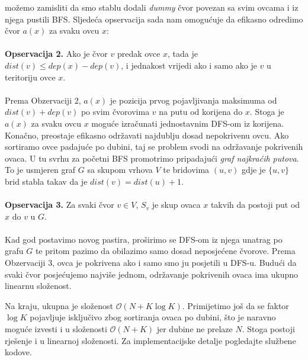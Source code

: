 možemo zamisliti da smo stablu dodali \textit{dummy} čvor povezan sa svim ovcama
i iz njega pustili BFS. Sljedeća opservacija sada nam omogućuje da efikasno
odredimo čvor $a(x)$ za svaku ovcu $x$: \\\\
\textbf{Opservacija 2.} Ako je čvor $v$ predak ovce $x$, tada je $dist(v) \leq
dep(x) - dep(v)$, i jednakost vrijedi ako i samo ako je $v$ u teritoriju ovce
$x$.
\\\\
Prema Obzervaciji $2$, $a(x)$ je pozicija prvog pojavljivanja maksimuma od
$dist(v) + dep(v)$ po svim čvorovima $v$ na putu od korijena do $x$. Stoga je
$a(x)$ za svaku ovcu $x$ moguće izračunati jednostavnim DFS-om iz korijena.
Konačno, preostaje efikasno održavati najdublju dosad nepokrivenu ovcu. Ako
sortiramo ovce padajuće po dubini, taj se problem svodi na održavanje
pokrivenih ovaca. U tu svrhu za početni BFS promotrimo pripadajući \textit{graf
najkraćih putova}. To je usmjeren graf $G$ sa skupom vrhova $V$ te bridovima
$(u, v)$ gdje je $\{u, v\}$ brid stabla takav da je $dist(v) = dist(u) + 1$.
\\\\
\textbf{Opservacija 3.} Za svaki čvor $v \in V$, $S_v$ je skup ovaca $x$ takvih
da postoji put od $x$ do $v$ u $G$.
\\\\
Kad god postavimo novog pastira, proširimo se DFS-om iz njega unatrag po grafu
$G$ te pritom pazimo da obilazimo samo dosad neposjećene čvorove. Prema
Obzervaciji 3, ovca je pokrivena ako i samo smo ju posjetili u DFS-u. Budući da
svaki čvor posjećujemo najviše jednom, održavanje pokrivenih ovaca ima ukupno
linearnu složenost.

Na kraju, ukupna je složenost $\mathcal{O}(N + K\log K)$. Primijetimo još da se
faktor $\log K$ pojavljuje isključivo zbog sortiranja ovaca po dubini, što je
naravno moguće izvesti i u složenosti $\mathcal{O}(N + K)$ jer dubine ne
prelaze $N$. Stoga postoji rješenje i u linearnoj složenosti. Za
implementacijske detalje pogledajte službene kodove.
